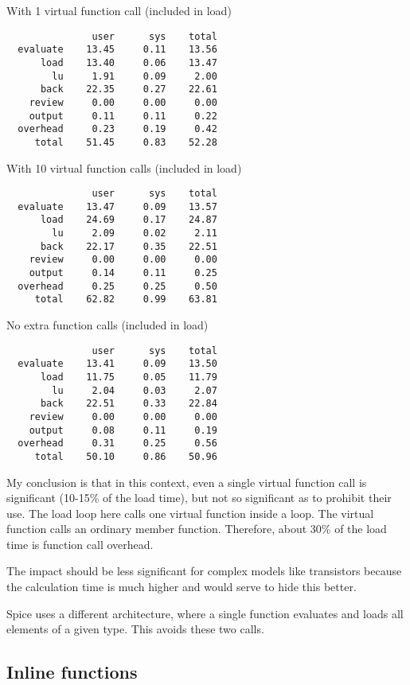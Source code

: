 With 1 virtual function call (included in load)
\begin{verbatim}
               user      sys    total
  evaluate    13.45     0.11    13.56
      load    13.40     0.06    13.47
        lu     1.91     0.09     2.00
      back    22.35     0.27    22.61
    review     0.00     0.00     0.00
    output     0.11     0.11     0.22
  overhead     0.23     0.19     0.42
     total    51.45     0.83    52.28
\end{verbatim}

With 10 virtual function calls (included in load)
\begin{verbatim}
               user      sys    total
  evaluate    13.47     0.09    13.57
      load    24.69     0.17    24.87
        lu     2.09     0.02     2.11
      back    22.17     0.35    22.51
    review     0.00     0.00     0.00
    output     0.14     0.11     0.25
  overhead     0.25     0.25     0.50
     total    62.82     0.99    63.81
\end{verbatim}

No extra function calls (included in load)
\begin{verbatim}
               user      sys    total
  evaluate    13.41     0.09    13.50
      load    11.75     0.05    11.79
        lu     2.04     0.03     2.07
      back    22.51     0.33    22.84
    review     0.00     0.00     0.00
    output     0.08     0.11     0.19
  overhead     0.31     0.25     0.56
     total    50.10     0.86    50.96
\end{verbatim}

My conclusion is that in this context, even a single virtual function
call is significant (10-15\% of the load time), but not so significant
as to prohibit their use.  The load loop here calls one virtual
function inside a loop.  The virtual function calls an ordinary
member function.  Therefore, about 30\% of the load time is function
call overhead.

The impact should be less significant for complex models like
transistors because the calculation time is much higher and would
serve to hide this better.

Spice uses a different architecture, where a single function
evaluates and loads all elements of a given type.  This avoids
these two calls.
\subsection{Inline functions}

